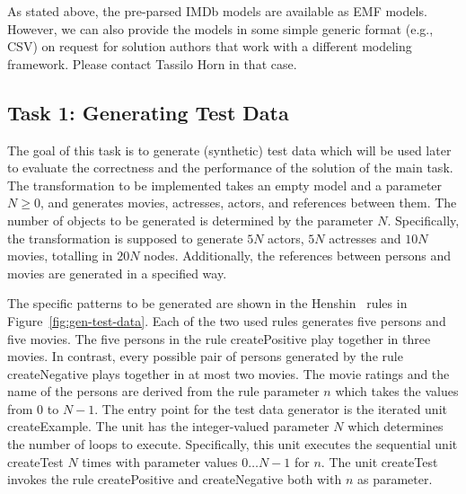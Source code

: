 \documentclass[a4paper,11pt]{article}
\begin{document}
As stated above, the pre-parsed IMDb models are available as EMF models.
However, we can also provide the models in some simple generic format (e.g.,
CSV) on request for solution authors that work with a different modeling
framework.  Please contact Tassilo Horn in that case.


\subsection{Task 1: Generating Test Data}
\label{sec:gen-test-data}


The goal of this task is to generate (synthetic) test data which will be used
later to evaluate the correctness and the performance of the solution of the
main task. The transformation to be implemented takes an empty model and a
parameter \(N\geq0\),
and generates movies, actresses, actors, and references between them.  The
number of objects to be generated is determined by the parameter $N$.
Specifically, the transformation is supposed to generate $5N$ actors, $5N$
actresses and $10N$ movies, totalling in $20N$ nodes.  Additionally, the
references between persons and movies are generated in a specified way.

The specific patterns to be generated are shown in the Henshin~\cite{ABJ+10}
rules in Figure~\ref{fig:gen-test-data}.  Each of the two used rules generates
five persons and five movies.  The five persons in the rule
\textsf{createPositive} play together in three movies.  In contrast, every
possible pair of persons generated by the rule \textsf{createNegative} plays
together in at most two movies.  The movie ratings and the name of the persons
are derived from the rule parameter $n$ which takes the values from 0 to
\(N-1\).
The entry point for the test data generator is the iterated unit
\textsf{createExample}.  The unit has the integer-valued parameter $N$ which
determines the number of loops to execute.  Specifically, this unit executes
the sequential unit \textsf{createTest} $N$ times with parameter values
$0\ldots{}N-1$ for $n$.  The unit \textsf{createTest} invokes the rule
\textsf{createPositive} and \textsf{createNegative} both with $n$ as parameter.
\end{document}
